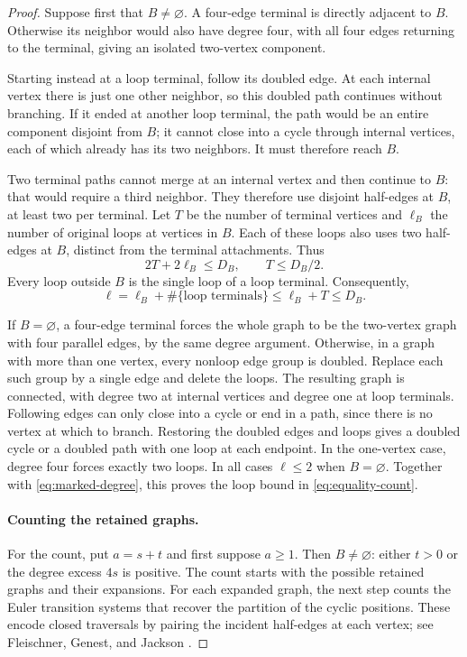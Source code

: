\documentclass[11pt]{article}
\theoremstyle{definition}
\theoremstyle{remark}
\theoremstyle{plain}
\begin{document}
\begin{proof}
Suppose first that \(B\ne\varnothing\). A four-edge terminal is directly adjacent
to \(B\). Otherwise its neighbor would also have degree four,
with all four edges returning to the terminal, giving an isolated
two-vertex component.

Starting instead at a loop terminal, follow
its doubled edge. At each internal vertex there is just one other
neighbor, so this doubled path continues without branching. If it
ended at another loop terminal, the path would be an entire
component disjoint from $B$; it cannot close into a cycle through
internal vertices, each of which already has its two neighbors.
It must therefore reach $B$.

Two terminal paths cannot merge at an internal vertex and then
continue to $B$: that would require a third neighbor. They therefore
use disjoint half-edges at $B$, at least two per terminal. Let $T$
be the number of terminal vertices and $\ell_B$ the number of
original loops at vertices in $B$. Each of these loops also uses
two half-edges at $B$, distinct from the terminal attachments. Thus
\[
 2T+2\ell_B\le D_B,\qquad T\le D_B/2.
\]
Every loop outside $B$ is the single loop of a loop terminal.
Consequently,
\[
 \ell=\ell_B+\#\{\text{loop terminals}\}
 \le\ell_B+T\le D_B.
\]

If \(B=\varnothing\), a four-edge terminal forces the whole graph
to be the two-vertex graph with four parallel edges, by the same
degree argument. Otherwise, in a graph with more than one vertex,
every nonloop edge group is doubled. Replace each such group by a
single edge and delete the loops. The resulting graph is connected,
with degree two at internal vertices and degree one at loop terminals.
Following edges can only close into a cycle or end in a path, since
there is no vertex at which to branch. Restoring the doubled edges
and loops gives a doubled cycle or a doubled path with one loop at
each endpoint. In the one-vertex case, degree four forces exactly
two loops. In all cases $\ell\le2$ when $B=\varnothing$.
Together with \eqref{eq:marked-degree}, this proves
the loop bound in \eqref{eq:equality-count}.

\paragraph{Counting the retained graphs.}
For the count, put $a=s+t$ and first suppose $a\ge1$.
Then $B\ne\varnothing$: either $t>0$ or the degree excess $4s$
is positive.
The count starts with the possible retained graphs and their expansions.
For each expanded graph, the next step counts the Euler transition systems
that recover the partition of the cyclic positions. These encode
closed traversals by pairing the incident half-edges at each vertex;
see Fleischner, Genest, and Jackson
\cite[Section~1]{fleischner_genest_jackson}.


\end{proof}
\end{document}
